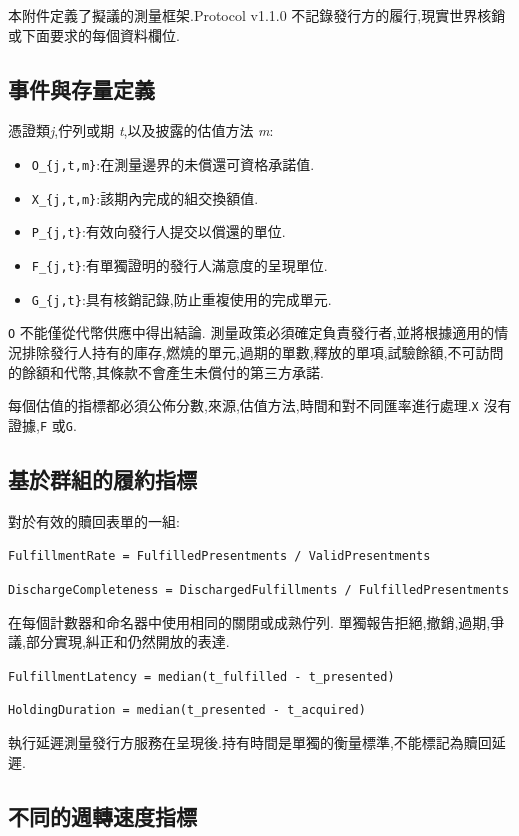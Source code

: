 \documentclass[11pt]{article}
\begin{document}
本附件定義了擬議的測量框架.Protocol v1.1.0 不記錄發行方的履行,現實世界核銷或下面要求的每個資料欄位.

\subsection*{事件與存量定義}

憑證類\emph{j},佇列或期 \emph{t},以及披露的估值方法 \emph{m}:

\begin{itemize}[leftmargin=*]
\item \texttt{O\_\{j,t,m\}}:在測量邊界的未償還可資格承諾值.
\item \texttt{X\_\{j,t,m\}}:該期內完成的組交換額值.
\item \texttt{P\_\{j,t\}}:有效向發行人提交以償還的單位.
\item \texttt{F\_\{j,t\}}:有單獨證明的發行人滿意度的呈現單位.
\item \texttt{G\_\{j,t\}}:具有核銷記錄,防止重複使用的完成單元.
\end{itemize}
\texttt{O} 不能僅從代幣供應中得出結論. 測量政策必須確定負責發行者,並將根據適用的情況排除發行人持有的庫存,燃燒的單元,過期的單數,釋放的單項,試驗餘額,不可訪問的餘額和代幣,其條款不會產生未償付的第三方承諾.

每個估值的指標都必須公佈分數,來源,估值方法,時間和對不同匯率進行處理.\texttt{X} 沒有證據,\texttt{F} 或\texttt{G}.

\subsection*{基於群組的履約指標}

對於有效的贖回表單的一組:

\texttt{FulfillmentRate = FulfilledPresentments / ValidPresentments}

\texttt{DischargeCompleteness = DischargedFulfillments / FulfilledPresentments}

在每個計數器和命名器中使用相同的關閉或成熟佇列. 單獨報告拒絕,撤銷,過期,爭議,部分實現,糾正和仍然開放的表達.

\texttt{FulfillmentLatency = median(t\_fulfilled - t\_presented)}

\texttt{HoldingDuration = median(t\_presented - t\_acquired)}

執行延遲測量發行方服務在呈現後.持有時間是單獨的衡量標準,不能標記為贖回延遲.

\subsection*{不同的週轉速度指標}
\end{document}
